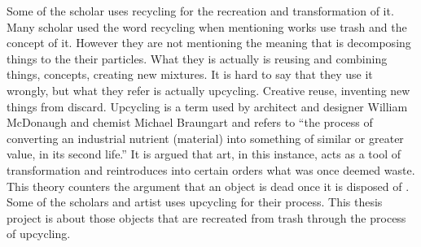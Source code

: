 Some of the scholar uses recycling \citep{cerny1996recycled,herman1998trashformations} for the recreation and transformation of it.  Many scholar used the word recycling when mentioning works use trash and the concept of it. However they are not mentioning the meaning that is decomposing things to the their particles. What they is actually is reusing and combining things, concepts, creating new mixtures. It is hard to say that they use it wrongly, but what they refer is actually upcycling. Creative reuse, inventing new things from discard. Upcycling is a term used by architect and designer William McDonaugh and chemist Michael Braungart and refers to “the process of converting an industrial nutrient (material) into something of similar or greater value, in its second life.” It is argued that art, in this instance, acts as a tool of transformation and reintroduces into certain orders what was once deemed waste. This theory counters the argument that an object is dead once it is disposed of \citep{emgin2012trashion}. Some of the scholars and artist uses upcycling for their process. This thesis project is about those objects that are recreated from trash through the process of upcycling.
